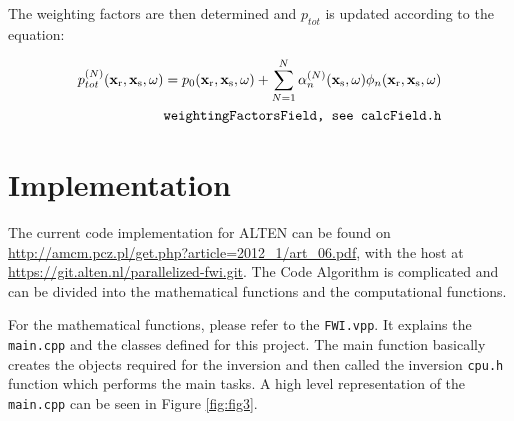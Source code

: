 \documentclass[10pt,a4paper]{article}
\begin{document}
The weighting factors are then determined and $p_{tot}$ is updated
according to the equation:

\begin{align} \label{eq:weightingFactorsField} p^{(N)}_{tot}
(\mathbf{x_\text{r}},\mathbf{x_\text{s}},\omega) =  p_0
(\mathbf{x_\text{r}},\mathbf{x_\text{s}},\omega) + \sum\limits_{N=1}^N
\alpha^{(N)}_n (\mathbf{x_\text{s}},\omega) \phi_n
(\mathbf{x_\text{r}},\mathbf{x_\text{s}},\omega)\\
\tag*{\texttt{weightingFactorsField, see calcField.h}}
\end{align}



\section{Implementation}
The current code implementation for ALTEN can be found on
\url{http://amcm.pcz.pl/get.php?article=2012_1/art_06.pdf}, with the
host at \url{https://git.alten.nl/parallelized-fwi.git}.
The Code Algorithm is complicated and can be divided into the
mathematical functions and the computational functions.

For the mathematical functions, please refer to the \texttt{FWI.vpp}.
It explains the \texttt{main.cpp} and the classes defined for this
project. The main function basically creates the objects required for
the inversion and then called the inversion \texttt{cpu.h} function
which performs the main tasks. A high level representation of the
\texttt{main.cpp} can be seen in Figure \ref{fig:fig3}.
\end{document}
